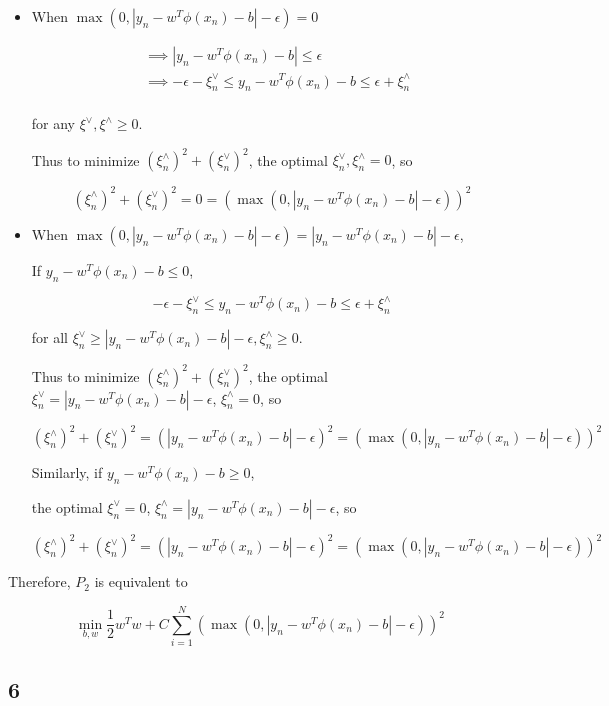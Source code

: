 \documentclass[fleqn,a4paper,12pt]{article}
\begin{document}
\begin{itemize}
\item
  When $\max(0, |y_n - w^T \phi(x_n) - b| - \epsilon) = 0$

  \begin{align*}
    &\implies |y_n - w^T \phi(x_n) - b| \leq \epsilon \\
    &\implies -\epsilon - \xi_n^{\vee} \leq y_n - w^T \phi(x_n) - b \leq \epsilon + \xi_n^{\wedge} \\
  \end{align*}

  for any $\xi^{\vee}, \xi^{\wedge} \geq 0$.

  Thus to minimize $(\xi_n^{\wedge})^2 + (\xi_n^{\vee})^2$, the optimal $\xi_n^{\vee}, \xi_n^{\wedge} = 0$, so

  $$(\xi_n^{\wedge})^2 + (\xi_n^{\vee})^2 = 0 = (\max(0, |y_n - w^T \phi(x_n) - b| - \epsilon))^2$$


\item  
  When $\max(0, |y_n - w^T \phi(x_n) - b| - \epsilon) = |y_n - w^T \phi(x_n) - b| - \epsilon$,

  If $y_n - w^T \phi(x_n) - b \leq 0$,

  $$-\epsilon - \xi_n^{\vee} \leq y_n - w^T \phi(x_n) - b \leq \epsilon + \xi_n^{\wedge}$$

  for all $\xi_n^{\vee} \geq |y_n - w^T \phi(x_n) - b| - \epsilon, \xi_n^{\wedge} \geq 0$.

  Thus to minimize $(\xi_n^{\wedge})^2 + (\xi_n^{\vee})^2$, the optimal $\xi_n^{\vee} = |y_n - w^T \phi(x_n) - b| - \epsilon$, $\xi_n^{\wedge} = 0$, so

  $$(\xi_n^{\wedge})^2 + (\xi_n^{\vee})^2 = (|y_n - w^T \phi(x_n) - b| - \epsilon)^2 = (\max(0, |y_n - w^T \phi(x_n) - b| - \epsilon))^2$$

  Similarly, if $y_n - w^T \phi(x_n) - b \geq 0$,

  the optimal $\xi_n^{\vee} = 0$, $\xi_n^{\wedge} = |y_n - w^T \phi(x_n) - b| - \epsilon$, so

  $$(\xi_n^{\wedge})^2 + (\xi_n^{\vee})^2 = (|y_n - w^T \phi(x_n) - b| - \epsilon)^2 = (\max(0, |y_n - w^T \phi(x_n) - b| - \epsilon))^2$$

\end{itemize}
  
Therefore, $P_2$ is equivalent to

$$\min_{b, w} \frac{1}{2} w^T w + C \sum_{i=1}^N (\max(0, |y_n - w^T \phi(x_n) - b| - \epsilon))^2$$

\subsection*{6}
\end{document}
